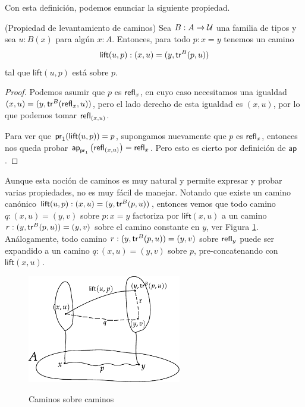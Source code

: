 \documentclass[../main.tex]{subfiles}
\begin{document}
Con esta definici\'on, podemos enunciar la siguiente propiedad.

\begin{lemma}(Propiedad de levantamiento de caminos)\label{path-lift}
  Sea $B:A\to \mathcal{U}$ una familia de tipos y sea $u:B(x)$ para alg\'un $x:A$. Entonces, para todo $p:x=y$ tenemos un camino
  \[ \mathsf{lift}(u,p): (x,u) = (y, \mathsf{tr}^{B}(p,u)) \]
  tal que $\mathsf{lift}(u,p)$ est\'a sobre $p$.
\end{lemma}
\begin{proof}
  Podemos asumir que $p$ es $\mathsf{refl}_{x}$, en cuyo caso necesitamos una igualdad $(x,u)=(y,{\mathsf{tr}^{B}(\mathsf{refl}_{x},u)})$, pero el lado derecho de esta igualdad es $(x,u)$, por lo que podemos tomar $\mathsf{refl}_{(x,u)}$.

  Para ver que $\mathsf{pr}_{1}(\mathsf{lift}(u,p))=p$, supongamos nuevamente que $p$ es $\mathsf{refl}_{x}$, entonces nos queda probar $\mathsf{ap}_{\mathsf{pr}_{1}} \left(\mathsf{refl}_{(x,u)}\right)=\mathsf{refl}_{x}$. Pero esto es cierto por definición de $\mathsf{ap}$.
\end{proof}

Aunque esta noci\'on de caminos es muy natural y permite expresar y probar varias propiedades, no es muy f\'acil de manejar.
Notando que existe un camino can\'onico $\mathsf{lift}(u,p):(x,u) = (y, \mathsf{tr}^{B}(p,u))$, entonces vemos que todo camino $q:(x,u)=(y,v)$ sobre $p:x=y$ factoriza por $\mathsf{lift}(x,u)$ a un camino $r:(y , \mathsf{tr}^{B}(p,u))=(y,v)$ sobre el camino constante en $y$, ver Figura \ref{caminos-sobre}.
An\'alogamente, todo camino $r:(y , \mathsf{tr}^{B}(p,u))=(y,v)$ sobre $\mathsf{refl}_{y}$ puede ser expandido a un camino $q:(x,u)=(y,v)$ sobre $p$, pre-concatenando con $\mathsf{lift}(x,u)$.

\begin{figure}[h]
  \caption{Caminos sobre caminos}
  \centering
  \vspace{1em}
  \includegraphics[width=0.6\textwidth]{images/caminoslevantados}
  \label{caminos-sobre}
\end{figure}
\end{document}
